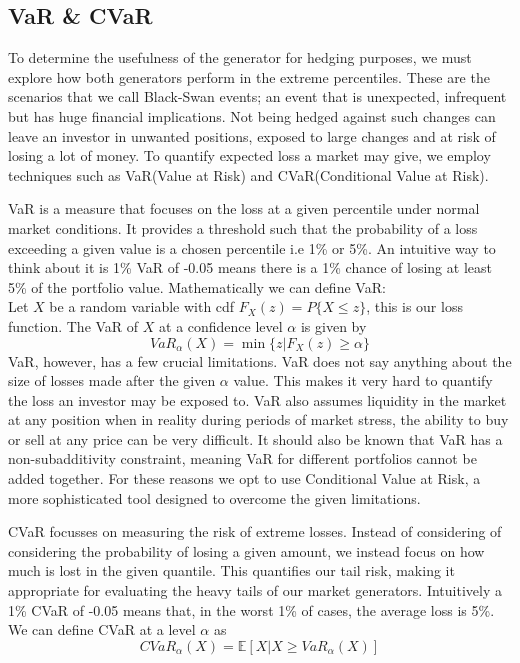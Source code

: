 \documentclass[12pt]{article}
\newcommand{\newp}
    {
    \vskip 0.5cm 
  }
\numberwithin{equation}{section}
\begin{document}
\newpage
\subsection{VaR \& CVaR}
To determine the usefulness of the generator for hedging purposes, we must explore 
how both generators perform in the extreme percentiles. These are the scenarios 
that we call Black-Swan events; an event that is unexpected, infrequent but has 
huge financial implications. Not being hedged against such changes can leave an 
investor in unwanted positions, exposed to large changes and at risk of losing 
a lot of money. To quantify expected loss a market may give, we employ techniques 
such as VaR(Value at Risk) and CVaR(Conditional Value at Risk). 
\newp 
VaR is a measure that focuses on the loss at a given percentile under normal 
market conditions. It provides a threshold such that the probability of a loss 
exceeding a given value is a chosen percentile i.e 1\% or 5\%. An intuitive 
way to think about it is 1\% VaR of -0.05 means there is a 1\% chance of 
losing at least 5\% of the portfolio value. Mathematically we can define VaR:\\ 
Let $X$ be a random variable with cdf $F_{X}(z)=P\{X\leq z\}$, this is our loss function. 
The VaR of $X$ at a confidence level $\alpha$ is given by
\begin{equation}
  VaR_\alpha(X) = \min\{z|F_X(z)\geq \alpha\}
\end{equation}
VaR, however, has a few crucial limitations. VaR does not say anything about the 
size of losses made after the given $\alpha$ value. This makes it very hard to 
quantify the loss an investor may be exposed to. VaR also assumes liquidity in 
the market at any position when in reality during periods of market stress, the 
ability to buy or sell at any price can be very difficult. It should also be 
known that VaR has a non-subadditivity constraint, meaning VaR for different portfolios 
cannot be added together. For these reasons we opt to use Conditional Value at 
Risk, a more sophisticated tool designed to overcome the given limitations. 
\newp 
CVaR focusses on measuring the risk of extreme losses. Instead of considering of 
considering the probability of losing a given amount, we instead focus on how 
much is lost in the given quantile. This quantifies our tail risk, making it 
appropriate for evaluating the heavy tails of our market generators. Intuitively 
a 1\% CVaR of -0.05 means that, in the worst 1\% of cases, the average loss is 5\%. 
We can define CVaR at a level $\alpha$ as 
\begin{equation}
  CVaR_{\alpha}(X) = \mathbb{E}[X | X \geq VaR_{\alpha}(X)]
\end{equation}
\end{document}
